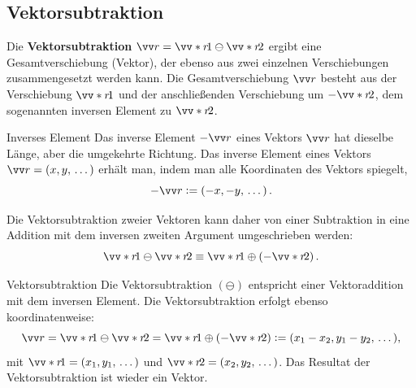 \subsection{Vektorsubtraktion}
Die \textbf{Vektorsubtraktion} $\ivec{r} = \ivecS{r}{1} \ominus \ivecS{r}{2}$ ergibt eine Gesamtverschiebung (Vektor), der ebenso aus zwei einzelnen Verschiebungen zusammengesetzt werden kann. Die Gesamtverschiebung $\ivec{r}$ besteht aus der Verschiebung $\ivecS{r}{1}$ und der anschließenden Verschiebung um $-\ivecS{r}{2}$, dem sogenannten inversen Element zu $\ivecS{r}{2}$.
\begin{rememberbox}[]{Inverses Element}
    Das inverse Element $-\ivec{r}$ eines Vektors $\ivec{r}$ hat dieselbe Länge, aber die umgekehrte Richtung. Das inverse Element eines Vektors $\ivec{r} = (x,y,\,\dots)$ erhält man, indem man alle Koordinaten des Vektors spiegelt, 
    \begin{equation}
        -\ivec{r} \defeq (-x,-y,\,\dots)\mDot
    \end{equation} 
\end{rememberbox}
Die Vektorsubtraktion zweier Vektoren kann daher von einer Subtraktion in eine Addition mit dem inversen zweiten Argument umgeschrieben werden: 
\begin{equation}
    \ivecS{r}{1} \ominus \ivecS{r}{2} \equiv \ivecS{r}{1} \oplus (-\ivecS{r}{2})\mDot
\end{equation}
\begin{rememberbox}[]{Vektorsubtraktion}
    Die Vektorsubtraktion $(\ominus)$ entspricht einer Vektoraddition mit dem inversen Element. Die Vektorsubtraktion erfolgt ebenso koordinatenweise:
    \begin{equation}
        \ivec{r} = \ivecS{r}{1} \ominus \ivecS{r}{2} = \ivecS{r}{1} \oplus (-\ivecS{r}{2}) \defeq (x_1 - x_2, y_1 - y_2,\,\dots),
    \end{equation}
mit $\ivecS{r}{1} = (x_1, y_1,\,\dots)$ und $\ivecS{r}{2} = (x_2, y_2, \,\dots)$. Das Resultat der Vektorsubtraktion ist wieder ein Vektor.
\end{rememberbox}


